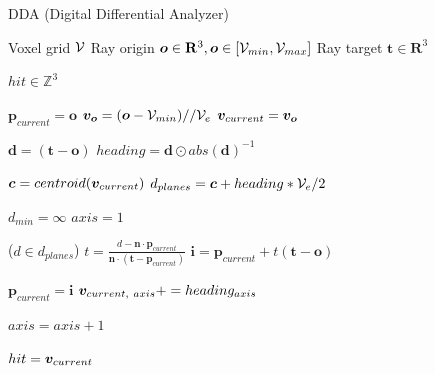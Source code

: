 \begin{algorithm}
    \caption{DDA (Digital Differential Analyzer)}
    \begin{algorithmic}

    \Require \quad Voxel grid \(\mathcal{V}\)
    \Require \quad Ray origin \(\boldsymbol{o} \in \mathbf{R}^3, \boldsymbol{o} \in [\mathcal{V}_{min}, \mathcal{V}_{max}]\)
    \Require \quad Ray target \(\boldsymbol{t} \in \mathbf{R}^3\)

    \Ensure \quad $hit \in \mathbb{Z}^{3}$ 

    \State $\boldsymbol{p}_{current} = \boldsymbol{o}$
    \State $\boldsymbol{v}_{\boldsymbol{o}} = (\boldsymbol{o} - \mathcal{V}_{min})//\mathcal{V}_{e}$
    \State $\boldsymbol{v}_{current} = \boldsymbol{v}_{\boldsymbol{o}}$

    \State $\boldsymbol{d} = (\boldsymbol{t} - \boldsymbol{o})$ 
    \State $heading = \boldsymbol{d} \odot abs(\boldsymbol{d})^{-1}$ 

        \State $\boldsymbol{c} = centroid(\boldsymbol{v}_{current})$
        \State $d_{planes} = \boldsymbol{c} + heading*\mathcal{V}_{e}/2$

        \State $d_{min} = \infty$
        \State $axis=1$

        \ForEach($d \in d_{planes}$)
            \State $t = \frac{d - \boldsymbol{n} \cdot \boldsymbol{p}_{current}}{\boldsymbol{n} \cdot (\boldsymbol{t} - \boldsymbol{p}_{current})}$
            \State $\boldsymbol{i} = \boldsymbol{p}_{current} + t(\boldsymbol{t} - \boldsymbol{o})$

                \State $\boldsymbol{p}_{current} = \boldsymbol{i}$
                \State $\boldsymbol{v}_{current,\ axis} += heading_{axis}$
            \EndIf

            \State $axis=axis+1$
        \EndFor

    \State $hit = \boldsymbol{v}_{current}$
    \EndWhile

\end{algorithmic}
\end{algorithm}

